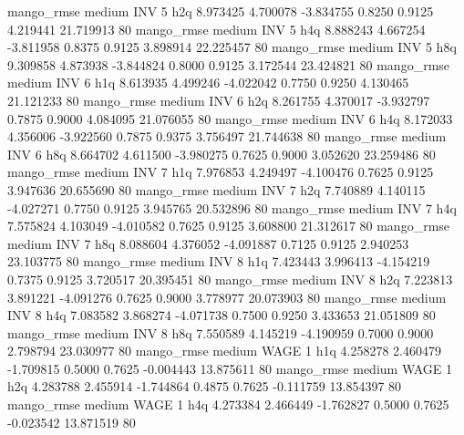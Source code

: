        mango_rmse     medium      INV                 5                  h2q  8.973425 4.700078 -3.834755 0.8250 0.9125  4.219441   21.719913 80
       mango_rmse     medium      INV                 5                  h4q  8.888243 4.667254 -3.811958 0.8375 0.9125  3.898914   22.225457 80
       mango_rmse     medium      INV                 5                  h8q  9.309858 4.873938 -3.844824 0.8000 0.9125  3.172544   23.424821 80
       mango_rmse     medium      INV                 6                  h1q  8.613935 4.499246 -4.022042 0.7750 0.9250  4.130465   21.121233 80
       mango_rmse     medium      INV                 6                  h2q  8.261755 4.370017 -3.932797 0.7875 0.9000  4.084095   21.076055 80
       mango_rmse     medium      INV                 6                  h4q  8.172033 4.356006 -3.922560 0.7875 0.9375  3.756497   21.744638 80
       mango_rmse     medium      INV                 6                  h8q  8.664702 4.611500 -3.980275 0.7625 0.9000  3.052620   23.259486 80
       mango_rmse     medium      INV                 7                  h1q  7.976853 4.249497 -4.100476 0.7625 0.9125  3.947636   20.655690 80
       mango_rmse     medium      INV                 7                  h2q  7.740889 4.140115 -4.027271 0.7750 0.9125  3.945765   20.532896 80
       mango_rmse     medium      INV                 7                  h4q  7.575824 4.103049 -4.010582 0.7625 0.9125  3.608800   21.312617 80
       mango_rmse     medium      INV                 7                  h8q  8.088604 4.376052 -4.091887 0.7125 0.9125  2.940253   23.103775 80
       mango_rmse     medium      INV                 8                  h1q  7.423443 3.996413 -4.154219 0.7375 0.9125  3.720517   20.395451 80
       mango_rmse     medium      INV                 8                  h2q  7.223813 3.891221 -4.091276 0.7625 0.9000  3.778977   20.073903 80
       mango_rmse     medium      INV                 8                  h4q  7.083582 3.868274 -4.071738 0.7500 0.9250  3.433653   21.051809 80
       mango_rmse     medium      INV                 8                  h8q  7.550589 4.145219 -4.190959 0.7000 0.9000  2.798794   23.030977 80
       mango_rmse     medium     WAGE                 1                  h1q  4.258278 2.460479 -1.709815 0.5000 0.7625 -0.004443   13.875611 80
       mango_rmse     medium     WAGE                 1                  h2q  4.283788 2.455914 -1.744864 0.4875 0.7625 -0.111759   13.854397 80
       mango_rmse     medium     WAGE                 1                  h4q  4.273384 2.466449 -1.762827 0.5000 0.7625 -0.023542   13.871519 80
